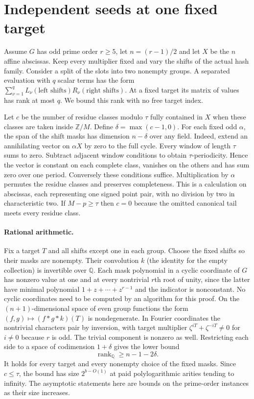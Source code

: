 \documentclass[11pt]{article}
\begin{document}
\section{Independent seeds at one fixed target}
Assume $G$ has odd prime order $r\ge5$, let $n=(r-1)/2$ and
let $X$ be the $n$ affine abscissas. Keep every multiplier fixed and
vary the shifts of the actual hash family. Consider a split of the slots
into two nonempty groups. A separated evaluation with $q$ scalar terms
has the form $\sum_{\nu=1}^q L_\nu(\text{left shifts})
R_\nu(\text{right shifts})$. At a fixed target its matrix of values
has rank at most $q$. We bound this rank with no free target index.

Let $c$ be the number of residue classes modulo $\tau$ fully contained
in $X$ when these classes are taken inside $\mathbb Z/M$. Define
$\delta=\max(c-1,0)$. For each fixed odd $\alpha$, the span of the
shift masks has dimension $n-\delta$ over any field. Indeed, extend
an annihilating vector on $\alpha X$ by zero to the full cycle.
Every window of length $\tau$ sums to zero. Subtract adjacent window
conditions to obtain $\tau$-periodicity. Hence the vector is constant
on each complete class, vanishes on the others and has sum zero over
one period. Conversely these conditions suffice. Multiplication by
$\alpha$ permutes the residue classes and preserves completeness.
This is a calculation on abscissas, each representing one signed
point pair, with no division by two in characteristic two. If
$M-p\ge\tau$ then $c=0$ because the omitted canonical tail meets
every residue class.

\paragraph{Rational arithmetic.}
Fix a target $T$ and all shifts except one in each group. Choose the
fixed shifts so their masks are nonempty. Their convolution $k$
(the identity for the empty collection) is invertible over
$\mathbb Q$. Each mask polynomial in a cyclic coordinate of $G$ has
nonzero value at one and at every nontrivial $r$th root of unity,
since the latter have minimal polynomial $1+z+\cdots+z^{r-1}$ and
the indicator is nonconstant. No cyclic coordinates need to be
computed by an algorithm for this proof.
On the $(n+1)$-dimensional space of even group functions the form
$(f,g)\mapsto(f*g*k)(T)$ is nondegenerate. In Fourier coordinates
the nontrivial characters pair by inversion, with target multiplier
$\zeta^{iT}+\zeta^{-iT}\ne0$ for $i\ne0$ because $r$ is odd.
The trivial component is nonzero as well. Restricting each side to a
space of codimension $1+\delta$ gives the lower bound
\[
       \operatorname{rank}_{\mathbb Q} \ge n-1-2\delta .
\]
It holds for every target and every nonempty choice of the fixed masks.
Since $c\le\tau$, the bound has size $2^{b-O(1)}$ at paid polylogarithmic
arities tending to infinity. The asymptotic statements here are bounds
on the prime-order instances as their size increases.
\end{document}
